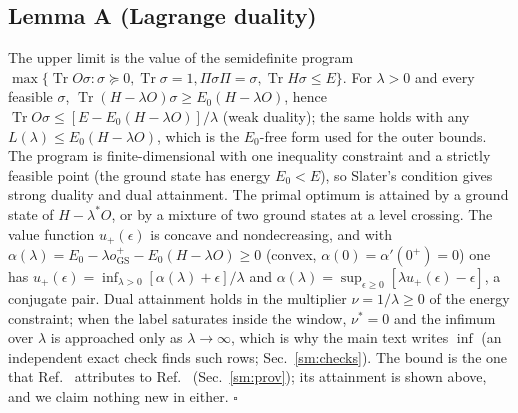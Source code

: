 \documentclass[aps,prx,onecolumn,10pt,nofootinbib,longbibliography,floatfix]{revtex4-2}
\theoremstyle{remark}
\newcommand{\Tr}{\operatorname{Tr}}
\newcommand{\GS}{\mathrm{GS}}
\begin{document}
\subsection{Lemma A (Lagrange duality)}
The upper limit is the value of the semidefinite program $\max\{\Tr O\sigma:\sigma\succeq0,\Tr\sigma=1, %
\Pi\sigma\Pi=\sigma,\Tr H\sigma\le E\}$. For $\lambda>0$ and every feasible $\sigma$, %
$\Tr(H-\lambda O)\sigma\ge E_0(H-\lambda O)$, hence $\Tr O\sigma\le[E-E_0(H-\lambda O)]/\lambda$ (weak duality); the %
same holds with any $L(\lambda)\le E_0(H-\lambda O)$, which is the $E_0$-free form used for the outer bounds. The %
program is finite-dimensional with one inequality constraint and a strictly feasible point (the ground state has
energy $E_0<E$), so Slater's condition gives strong duality and dual attainment. The primal optimum is attained by a %
ground state of $H-\lambda^*O$, or by a mixture of two ground states at a level crossing. The value function
$u_+(\epsilon)$ is concave and nondecreasing, and with $\alpha(\lambda)=E_0-\lambda o_\GS^+-E_0(H-\lambda O)\ge0$ %
(convex, $\alpha(0)=\alpha'(0^+)=0$) one has $u_+(\epsilon)=\inf_{\lambda>0}[\alpha(\lambda)+\epsilon]/\lambda$ and %
$\alpha(\lambda)=\sup_{\epsilon\ge0}[\lambda u_+(\epsilon)-\epsilon]$, a conjugate pair. Dual attainment holds in the multiplier $\nu=1/\lambda\ge0$ of the energy constraint; when the label saturates inside the window,
$\nu^*=0$ and the infimum over $\lambda$ is approached only as $\lambda\to\infty$, which is why the main text writes $\inf$ (an independent exact check finds such rows; Sec.~\ref{sm:checks}). The bound is the one that Ref.~\cite{manchanda2026} attributes to %
Ref.~\cite{cohen1971} (Sec.~\ref{sm:prov}); its attainment is shown above, and we claim nothing new in either. \hfill$\square$ %
\end{document}

